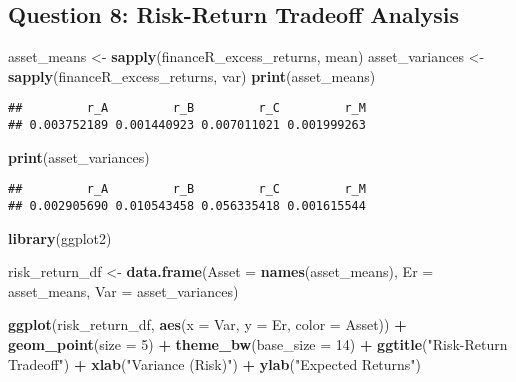 \documentclass[
]{article}
\newenvironment{Shaded}{\begin{snugshade}}{\end{snugshade}}
\newcommand{\AttributeTok}[1]{\textcolor[rgb]{0.13,0.29,0.53}{#1}}
\newcommand{\DecValTok}[1]{\textcolor[rgb]{0.00,0.00,0.81}{#1}}
\newcommand{\FunctionTok}[1]{\textcolor[rgb]{0.13,0.29,0.53}{\textbf{#1}}}
\newcommand{\NormalTok}[1]{#1}
\newcommand{\OtherTok}[1]{\textcolor[rgb]{0.56,0.35,0.01}{#1}}
\newcommand{\SpecialCharTok}[1]{\textcolor[rgb]{0.81,0.36,0.00}{\textbf{#1}}}
\newcommand{\StringTok}[1]{\textcolor[rgb]{0.31,0.60,0.02}{#1}}
\begin{document}
\hypertarget{question-8-risk-return-tradeoff-analysis}{%
\subsection{Question 8: Risk-Return Tradeoff
Analysis}\label{question-8-risk-return-tradeoff-analysis}}

\begin{Shaded}
\begin{Highlighting}[]
\NormalTok{asset\_means }\OtherTok{\textless{}{-}} \FunctionTok{sapply}\NormalTok{(financeR\_excess\_returns, mean)}
\NormalTok{asset\_variances }\OtherTok{\textless{}{-}} \FunctionTok{sapply}\NormalTok{(financeR\_excess\_returns, var)}
\FunctionTok{print}\NormalTok{(asset\_means)}
\end{Highlighting}
\end{Shaded}

\begin{verbatim}
##         r_A         r_B         r_C         r_M 
## 0.003752189 0.001440923 0.007011021 0.001999263
\end{verbatim}

\begin{Shaded}
\begin{Highlighting}[]
\FunctionTok{print}\NormalTok{(asset\_variances)}
\end{Highlighting}
\end{Shaded}

\begin{verbatim}
##         r_A         r_B         r_C         r_M 
## 0.002905690 0.010543458 0.056335418 0.001615544
\end{verbatim}

\begin{Shaded}
\begin{Highlighting}[]
\FunctionTok{library}\NormalTok{(ggplot2)}

\NormalTok{risk\_return\_df }\OtherTok{\textless{}{-}} \FunctionTok{data.frame}\NormalTok{(}\AttributeTok{Asset =} \FunctionTok{names}\NormalTok{(asset\_means), }\AttributeTok{Er =}\NormalTok{ asset\_means, }\AttributeTok{Var =}\NormalTok{ asset\_variances)}

\FunctionTok{ggplot}\NormalTok{(risk\_return\_df, }\FunctionTok{aes}\NormalTok{(}\AttributeTok{x =}\NormalTok{ Var, }\AttributeTok{y =}\NormalTok{ Er, }\AttributeTok{color =}\NormalTok{ Asset)) }\SpecialCharTok{+}
  \FunctionTok{geom\_point}\NormalTok{(}\AttributeTok{size =} \DecValTok{5}\NormalTok{) }\SpecialCharTok{+} \FunctionTok{theme\_bw}\NormalTok{(}\AttributeTok{base\_size =} \DecValTok{14}\NormalTok{) }\SpecialCharTok{+}
  \FunctionTok{ggtitle}\NormalTok{(}\StringTok{"Risk{-}Return Tradeoff"}\NormalTok{) }\SpecialCharTok{+}
  \FunctionTok{xlab}\NormalTok{(}\StringTok{"Variance (Risk)"}\NormalTok{) }\SpecialCharTok{+} \FunctionTok{ylab}\NormalTok{(}\StringTok{"Expected Returns"}\NormalTok{)}
\end{Highlighting}
\end{Shaded}
\end{document}
